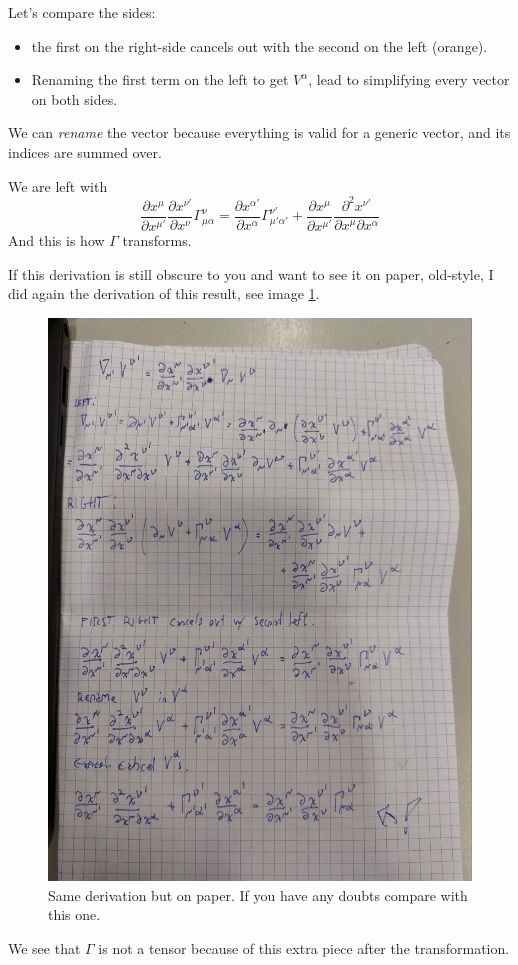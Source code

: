 Let's compare the sides:
\begin{itemize}
\item the first on the right-side cancels out with the second on the left (orange).
\item Renaming the first term on the left to get $V^{\alpha }$, lead to simplifying every vector on both sides.
\end{itemize}
We can \emph{rename} the vector because everything is valid for a generic vector, and its indices are summed over.\par
We are left with
\[
\frac{\partial x^{\mu }}{\partial x^{\mu '}}  \frac{\partial x^{\nu '}}{\partial x^{\nu }} \Gamma ^{\nu }_{\mu \alpha } = \frac{\partial x^{\alpha' }}{\partial x^{\alpha }} \Gamma ^{\nu '}_{\mu '\alpha '} + \frac{\partial x^{\mu }}{\partial x^{\mu '}} \frac{\partial ^{2}x^{\nu '}}{\partial x^{\mu }\partial x^{\alpha }} 
\]
And this is how $\Gamma $ transforms.\par

If this derivation is still obscure to you and want to see it on paper, old-style, I did again the derivation of this result, see image \ref{imm:conntransf}.
\begin{figure}[h]
\centering
\includegraphics[width=0.8\linewidth]{imm/conntransf.jpg}
\caption{Same derivation but on paper. If you have any doubts compare with this one.}
\label{imm:conntransf}
\end{figure}
We see that $\Gamma $ is not a tensor because of this extra piece after the transformation.\par

